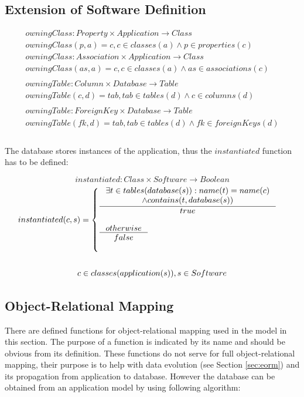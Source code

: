 \documentclass[11pt]{article}
\begin{document}
\subsection{Extension of Software Definition}

\begin{align*}
 owningClass : Property \times Application \rightarrow Class  \\ owningClass(p, a) = c, c \in classes(a) \wedge p \in properties(c) \\
  owningClass : Association \times Application \rightarrow Class  \\
owningClass(as, a) = c, c \in classes(a) \wedge as \in associations(c) \\ \\
owningTable : Column \times Database \rightarrow Table  \\
owningTable(c, d) = tab, tab \in tables(d) \wedge c \in columns(d) \\ \\
owningTable : ForeignKey \times Database \rightarrow Table  \\
owningTable(fk, d) = tab, tab \in tables(d) \wedge fk \in foreignKeys(d)\\ \\ 
\end{align*}


The database stores instances of the application, thus the $instantiated$ function has to be defined:

$$instantiated : Class \times Software \rightarrow Boolean $$ 
\begin{equation*}
\begin{gathered}
	instantiated(c, s) = \begin{cases}
 \inference{\exists t \in tables(database(s)) : name(t) = name(c) \\ \wedge contains(t, database(s))}{true} \\ \\
  \inference{otherwise}{false} \\ \\
 \end{cases} \\ \\
 c \in classes(application(s)), s \in Software 
\end{gathered}
\end{equation*}

\subsection{Object-Relational Mapping}
\label{sec:orm}
There are defined functions for object-relational mapping used in the model in this section. The purpose of a function is indicated by its name and should be obvious from its definition. These functions do not serve for full object-relational mapping, their purpose is to help with data evolution (see Section \ref{sec:eorm}) and its propagation from application to database. However the database can be obtained from an application model by using following algorithm:
\end{document}
